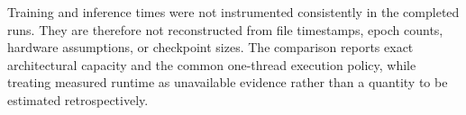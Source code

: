 

Training and inference times were not instrumented consistently in the
completed runs. They are therefore not reconstructed from file timestamps,
epoch counts, hardware assumptions, or checkpoint sizes. The comparison
reports exact architectural capacity and the common one-thread execution
policy, while treating measured runtime as unavailable evidence rather than a
quantity to be estimated retrospectively.
